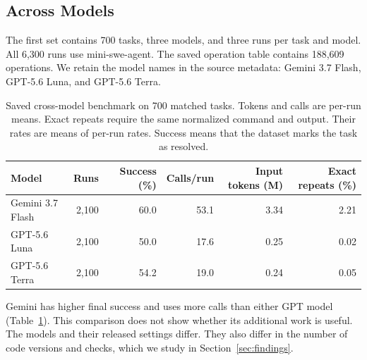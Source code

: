 \documentclass[10pt,a4paper,twocolumn]{article}
\begin{document}
\subsection{Across Models}
The first set contains 700 tasks, three models, and three runs per task and model. All 6,300 runs use mini-swe-agent. The saved operation table contains 188,609 operations. We retain the model names in the source metadata: Gemini 3.7 Flash, GPT-5.6 Luna, and GPT-5.6 Terra.
\begin{table}[t]
\centering\small\setlength{\tabcolsep}{8pt}
\begin{tabular}{lrrrrr}
\toprule
Model & Runs & Success (\%) & Calls/run & Input tokens (M) & Exact repeats (\%)\\
\midrule
Gemini 3.7 Flash & 2,100 & 60.0 & 53.1 & 3.34 & 2.21\\
GPT-5.6 Luna & 2,100 & 50.0 & 17.6 & 0.25 & 0.02\\
GPT-5.6 Terra & 2,100 & 54.2 & 19.0 & 0.24 & 0.05\\
\bottomrule
\end{tabular}
\caption{Saved cross-model benchmark on 700 matched tasks. Tokens and calls are per-run means. Exact repeats require the same normalized command and output. Their rates are means of per-run rates. Success means that the dataset marks the task as resolved.}
\label{tab:model}
\end{table}
Gemini has higher final success and uses more calls than either GPT model (Table~\ref{tab:model}). This comparison does not show whether its additional work is useful. The models and their released settings differ. They also differ in the number of code versions and checks, which we study in Section~\ref{sec:findings}.
\end{document}
